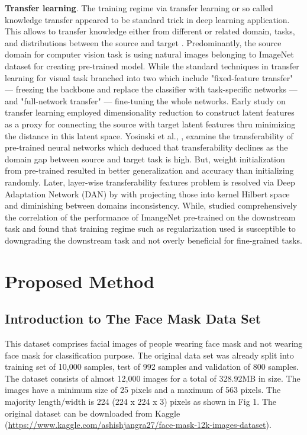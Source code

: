 \documentclass[conference]{IEEEtran}
\begin{document}
\textbf{Transfer learning}. The training regime via transfer learning or so called knowledge transfer appeared to be standard trick in deep learning application. This allows to transfer knowledge either from different or related domain, tasks, and distributions between the source and target \cite{Pan2010ASO, Torrey2009Chapter1T}. Predominantly, the source domain for computer vision task is using natural images belonging to ImageNet\cite{5206848} dataset for creating pre-trained model. While the standard techniques in transfer learning for visual task branched into two which include "fixed-feature transfer" --- freezing the backbone and replace the classifier with task-specific networks --- and "full-network transfer"\cite{Salman2020DoAR} --- fine-tuning the whole networks. Early study on transfer learning employed dimensionality reduction to construct latent features as a proxy for connecting the source with target latent features thru minimizing the distance in this latent space\cite{Pan2008}. Yosinski et al., \cite{Yosinski2014HowTA}, examine the transferability of pre-trained neural networks which deduced that transferability declines as the domain gap between source and target task is high. But, weight initialization from pre-trained resulted in better generalization and accuracy than initializing randomly. Later, layer-wise transferability features problem is resolved via Deep Adaptation Network (DAN) by \cite{DBLP:conf/icml/LongC0J15} with projecting those into kernel Hilbert space and diminishing between domains inconsistency. While, \cite{Kornblith2019DoBI} studied comprehensively the correlation of the performance of ImangeNet pre-trained on the downstream task and found that training regime such as regularization used is susceptible to downgrading the downstream task and not overly beneficial for fine-grained tasks.

\section{Proposed Method}

\subsection{Introduction to The Face Mask Data Set}

This dataset comprises facial images of people wearing face mask and not wearing face mask for classification purpose. The original data set was already split into training set of 10,000 samples, test  of 992 samples and validation of 800 samples. The dataset consists of almost 12,000 images for a total of  328.92MB in size. The images have a minimum size of 25 pixels and a maximum of 563 pixels. The majority length/width is 224 (224 x 224 x 3) pixels as shown in Fig 1. The original dataset can be downloaded from Kaggle (\url{https://www.kaggle.com/ashishjangra27/face-mask-12k-images-dataset}).
\end{document}
